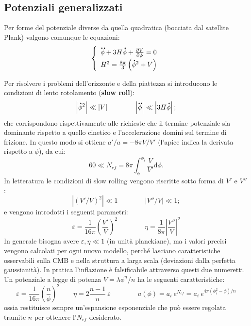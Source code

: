 \subsection{Potenziali generalizzati}\label{ch5:epsieta}
Per forme del potenziale diverse da quella quadratica (bocciata dal satellite Plank) valgono comunque le equazioni:
\begin{equation*}\left\{
    \def\arraystretch{1.5}
        \begin{array}{ll}
            \ddt{\phi} + 3H \dt{\phi} + \frac{\partial V}{\partial \phi} =0\\ 
            H^2 = \frac{8\pi}{3} \left(\dt{\phi}^2+V\right)
    \end{array}\right.
\end{equation*}

Per risolvere i problemi dell'orizzonte e della piattezza si introducono le condizioni di lento rotolamento (\textbf{slow roll}):
\begin{equation}
    \left| \accentset{\mbox{\large\bfseries .}}{\phi}^2 \right| \ll \left| V \right|  \qquad\qquad \left| \accentset{\mbox{\large\bfseries ..}}{\phi} \right| \ll \left| 3H\accentset{\mbox{\large\bfseries .}}{\phi} \right|;
\end{equation}
che corrispondono rispettivamente alle richieste che il termine potenziale sia dominante rispetto a quello cinetico e l'accelerazione domini sul termine di frizione. In questo modo si ottiene $a'/a = -8\pi V/V'$ (l'apice indica la derivata rispetto a $\phi$), da cui:
\begin{equation}
    60 \ll N_{ef} = 8\pi \int_\phi^{\phi_i} \frac{V}{V'} \mathrm{d}\phi. 
\end{equation}
In letteratura le condizioni di slow rolling vengono riscritte sotto forma di $V'$ e $V''$:
\begin{equation}
    \left| \left( V'/V\right)^2 \right| \ll 1 \qquad\qquad \left|  V''/V \right| \ll 1;
\end{equation}
e vengono introdotti i seguenti parametri:
\begin{equation}
    \varepsilon = \frac{1}{16\pi}\left(\frac{V'}{V}\right)^2 \qquad\qquad \eta = \frac{1}{8\pi}\left|\frac{V''}{V}\right|^2
\end{equation}
In generale bisogna avere $\varepsilon, \eta \ll 1$ (in unità planckiane), ma i valori precisi vengono calcolati per ogni nuovo modello, perché lasciano caratteristiche osservabili sulla CMB e nella struttura a larga scala (deviazioni dalla perfetta gaussianità). In pratica l'inflazione è falsificabile attraverso questi due numeretti. Un potenziale a legge di potenza $V=\lambda \phi^n / n$ ha le seguenti caratteristiche:
\begin{equation}
    \varepsilon =   \frac{1}{16\pi} \left( \frac{n}{\phi}\right)^2 \qquad \eta= 2 \frac{n-1}{n} ~\varepsilon \qquad\qquad a(\phi)=a_i ~e^{N_{ef}} = a_i ~e^{4\pi(\phi_i^2-\phi)/n}
\end{equation}
ossia restituisce sempre un'espansione esponenziale che può essere regolata tramite $n$ per ottenere l'$N_{ef}$ desiderato.

